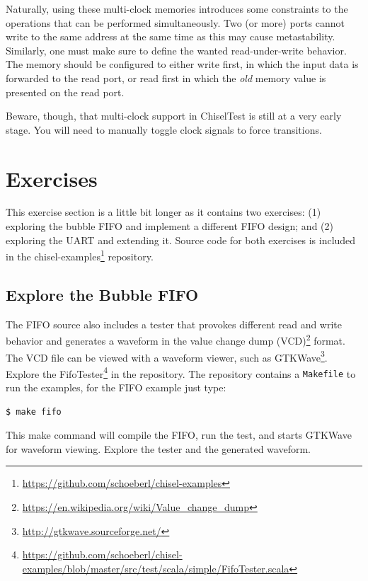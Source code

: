 \documentclass[%
    10pt,
    headinclude, footexclude,
    openright, %
    notitlepage,
    cleardoubleempty,
    headsepline,
    pointlessnumbers,
    bibtotoc, idxtotoc,
    ]{scrbook}
\newcommand{\code}[1]{{\small{\texttt{#1}}}}
\newcommand{\myref}[2]{\href{#1}{#2}}
\renewcommand{\myref}[2]{{#2}{\footnote{\url{#1}}}}
\begin{document}

Naturally, using these multi-clock memories introduces some constraints to the 
operations that can be performed simultaneously. Two (or more) ports cannot 
write to the same address at the same time as this may cause metastability. 
Similarly, one must make sure to define the wanted read-under-write behavior.
The memory should be configured to either write first, in which the input data is 
forwarded to the read port, or read first in which the \emph{old} memory value 
is presented on the read port. 

Beware, though, that multi-clock support in ChiselTest is still at a very early 
stage. You will need to manually toggle clock signals to force transitions.


\section{Exercises}

This exercise section is a little bit longer as it contains two exercises:
(1) exploring the bubble FIFO and implement a different FIFO design;
and (2) exploring the UART and extending it.
Source code for both exercises is included in the
\myref{https://github.com/schoeberl/chisel-examples}{chisel-examples} repository.

\subsection{Explore the Bubble FIFO}

The FIFO source also includes a tester that provokes different read and write behavior and generates a waveform in the 
\myref{https://en.wikipedia.org/wiki/Value_change_dump}{value change dump (VCD)} format.
The VCD file can be viewed with a waveform viewer, such as
\myref{http://gtkwave.sourceforge.net/}{GTKWave}.
Explore the
\myref{https://github.com/schoeberl/chisel-examples/blob/master/src/test/scala/simple/FifoTester.scala}{FifoTester} in the repository.
The repository contains a \code{Makefile} to run the examples, for the FIFO example
just type:
\begin{verbatim}
$ make fifo
\end{verbatim}
This make command will compile the FIFO, run the test, and starts GTKWave for waveform
viewing. Explore the tester and the generated waveform.
\end{document}
